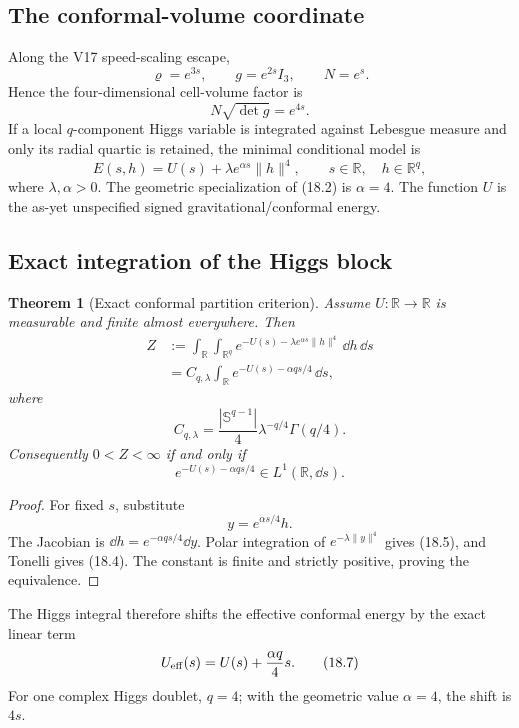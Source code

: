 \documentclass[11pt]{article}
\newtheorem{theorem}{Theorem}[section]
\theoremstyle{remark}
\begin{document}
\subsection{The conformal-volume coordinate}

Along the V17 speed-scaling escape,
\[
 \varrho=e^{3s},\qquad g=e^{2s}I_3,\qquad N=e^s.    \tag{18.1}
\]
Hence the four-dimensional cell-volume factor is
\[
 N\sqrt{\det g}=e^{4s}.                            \tag{18.2}
\]
If a local \(q\)-component Higgs variable is integrated against
Lebesgue measure and only its radial quartic is retained, the
minimal conditional model is
\[
 E(s,h)=U(s)+\lambda e^{\alpha s}\|h\|^4,
 \qquad
 s\in\mathbb R,\quad h\in\mathbb R^q,              \tag{18.3}
\]
where \(\lambda,\alpha>0\).  The geometric specialization of
(18.2) is \(\alpha=4\).  The function \(U\) is the as-yet
unspecified signed gravitational/conformal energy.

\subsection{Exact integration of the Higgs block}

\begin{theorem}[Exact conformal partition criterion]
\label{thm:v17v18-partition}
Assume \(U:\mathbb R\to\mathbb R\) is measurable and finite almost
everywhere.  Then
\[
\begin{aligned}
 Z
 &:=\int_{\mathbb R}\int_{\mathbb R^q}
 e^{-U(s)-\lambda e^{\alpha s}\|h\|^4}\,\dd h\,\dd s\\
 &=C_{q,\lambda}
 \int_{\mathbb R}
 e^{-U(s)-\alpha q s/4}\,\dd s,                   \tag{18.4}
\end{aligned}
\]
where
\[
 C_{q,\lambda}
 =\frac{|\mathbb S^{q-1}|}{4}
 \lambda^{-q/4}\Gamma(q/4).                       \tag{18.5}
\]
Consequently \(0<Z<\infty\) if and only if
\[
 e^{-U(s)-\alpha q s/4}\in L^1(\mathbb R,\dd s).  \tag{18.6}
\]
\end{theorem}

\begin{proof}
For fixed \(s\), substitute
\[
 y=e^{\alpha s/4}h.
\]
The Jacobian is
\(\dd h=e^{-\alpha q s/4}\dd y\).  Polar integration of
\(e^{-\lambda\|y\|^4}\) gives (18.5), and Tonelli gives (18.4).
The constant is finite and strictly positive, proving the
equivalence.
\end{proof}

The Higgs integral therefore shifts the effective conformal energy
by the exact linear term
\[
 U_{\rm eff}(s)=U(s)+\frac{\alpha q}{4}s.           \tag{18.7}
\]
For one complex Higgs doublet, \(q=4\); with the geometric value
\(\alpha=4\), the shift is \(4s\).
\end{document}
